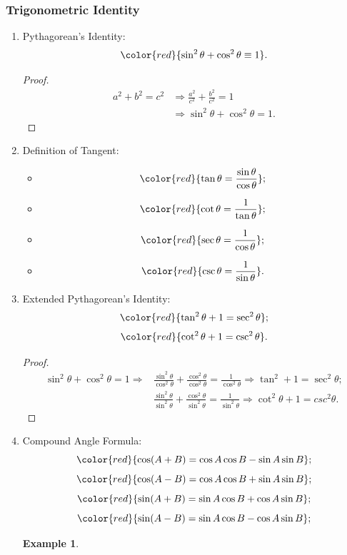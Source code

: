 \documentclass[12pt, a4paper]{article}
\newtheorem{example}{Example}[subsection]
\newtheorem{proof}{Proof}[subsection]
\begin{document}
\subsubsection{Trigonometric Identity}
\begin{enumerate}
  \item Pythagorean's Identity: 
  $${\color{red}{\sin^2\theta+\cos^2\theta\equiv1}}.$$
  \begin{proof}
    $$\begin{aligned}
      a^2+b^2=c^2&\Rightarrow\frac{a^2}{c^2}+\frac{b^2}{c^2}=1\\
      &\Rightarrow\sin^2\theta+\cos^2\theta=1.
    \end{aligned}$$
  \end{proof}
  \item Definition of Tangent: 
  \begin{itemize}
    \item $${\color{red}{\tan\theta=\frac{\sin\theta}{\cos\theta}}};$$
    \item $${\color{red}{\cot\theta=\frac{1}{\tan\theta}}};$$
    \item $${\color{red}{\sec\theta=\frac{1}{\cos\theta}}};$$
    \item $${\color{red}{\csc\theta=\frac{1}{\sin\theta}}}.$$
  \end{itemize}
  \item Extended Pythagorean's Identity: 
  $${\color{red}{\tan^2\theta+1=\sec^2\theta}};$$
  $${\color{red}{\cot^2\theta+1=\csc^2\theta}}.$$
  \begin{proof}
    $$\begin{aligned}
      \sin^2\theta+\cos^2\theta=1\Rightarrow&\frac{\sin^2\theta}{\cos^2\theta}+\frac{\cos^2\theta}{\cos^2\theta}=\frac{1}{\cos^2\theta}\Rightarrow\tan^2+1=\sec^2\theta;\\
      &\frac{\sin^2\theta}{\sin^2\theta}+\frac{\cos^2\theta}{\sin^2\theta}=\frac{1}{\sin^2\theta}\Rightarrow\cot^2\theta+1=csc^2\theta.
    \end{aligned}$$
    {\color{green}{N.B.: a reflex angle is an angle bigger than $180^\circ$, smaller than $360^\circ$.}}
  \end{proof}
  \item Compound Angle Formula: 
  $${\color{red}{\cos(A+B)=\cos{A}\cos{B}-\sin{A}\sin{B}}};$$
  $${\color{red}{\cos(A-B)=\cos{A}\cos{B}+\sin{A}\sin{B}}};$$
  $${\color{red}{\sin(A+B)=\sin{A}\cos{B}+\cos{A}\sin{B}}};$$
  $${\color{red}{\sin(A-B)=\sin{A}\cos{B}-\cos{A}\sin{B}}};$$
  \begin{example}

\end{example}
\end{enumerate}
\end{document}
